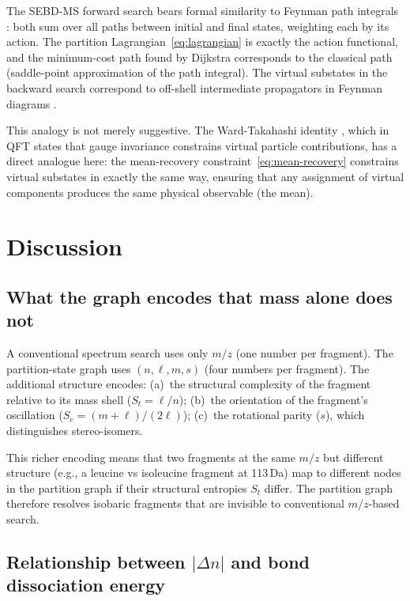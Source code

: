 \documentclass[twocolumn,10pt,a4paper]{article}
\theoremstyle{thmstyle}
\theoremstyle{definition}
\theoremstyle{remark}
\newcommand{\St}{S_{t}}
\newcommand{\Se}{S_{e}}
\begin{document}
The SEBD-MS forward search bears formal similarity to Feynman path
integrals \citep{feynman1965}: both sum over all paths between
initial and final states, weighting each by its action. The partition
Lagrangian~\eqref{eq:lagrangian} is exactly the action functional,
and the minimum-cost path found by Dijkstra corresponds to the
classical path (saddle-point approximation of the path integral).
The virtual substates in the backward search correspond to off-shell
intermediate propagators in Feynman diagrams \citep{peskin1995}.

This analogy is not merely suggestive. The Ward-Takahashi
identity \citep{ward1950}, which in QFT states that gauge invariance
constrains virtual particle contributions, has a direct analogue here:
the mean-recovery constraint~\eqref{eq:mean-recovery} constrains
virtual substates in exactly the same way, ensuring that any
assignment of virtual components produces the same physical observable
(the mean).

\section{Discussion}
\label{sec:discussion}

\subsection{What the graph encodes that mass alone does not}

A conventional spectrum search uses only $m/z$ (one number per
fragment). The partition-state graph uses $(n, \ell, m, s)$ (four
numbers per fragment). The additional structure encodes:
(a)~the structural complexity of the fragment relative to its mass
shell ($\St = \ell/n$);
(b)~the orientation of the fragment's oscillation ($\Se = (m+\ell)/(2\ell)$);
(c)~the rotational parity ($s$), which distinguishes stereo-isomers.

This richer encoding means that two fragments at the same $m/z$ but
different structure (e.g., a leucine vs isoleucine fragment at
113\,Da) map to different nodes in the partition graph if their
structural entropies $\St$ differ. The partition graph therefore
resolves isobaric fragments that are invisible to conventional
$m/z$-based search.

\subsection{Relationship between $|\Delta n|$ and bond dissociation energy}
\end{document}
